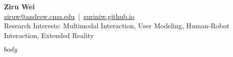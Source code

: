 \documentclass[a4paper,9pt]{extarticle}
\begin{document}
\pagestyle{empty}

\raggedright

\begin{center}
    {\fontsize{20}{24}\selectfont\bfseries Ziru Wei}\\[6pt]
        {\large
          \href{mailto:ziruw@andrew.cmu.edu}{ziruw@andrew.cmu.edu} \,|\, 
          \href{https://zuriniw.github.io}{zuriniw.github.io}
        }\\[6pt]
        {\small {Research Interests: Multimodal Interaction, User Modeling, Human-Robot Interaction, Extended Reality}}
    \end{center}
    
    

$body$
\end{document}
